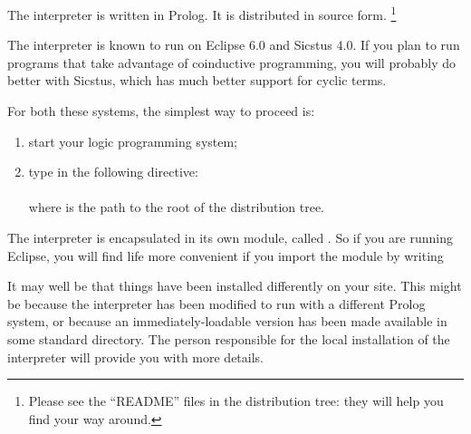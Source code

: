 
The interpreter is written in Prolog.  It is distributed in source
form.%
\footnote{
  Please see the ``README'' files in the distribution tree: they will help you
  find your way around.}

The interpreter is known to run on Eclipse 6.0 and Sicstus 4.0.  If you plan
to run programs that take advantage of coinductive programming, you will
probably do better with Sicstus, which has much better support for cyclic
terms.

For both these systems, the simplest way to proceed is:
\begin{enumerate}
\item start your logic programming system;
\item type in the following directive:\\
  \ind\prog{:-~[~'}\prog{/tabling/dra'~]}\\
  where  is the path to the root of the distribution tree.
\end{enumerate}

The interpreter is encapsulated in its own module, called .  So
if you are running Eclipse, you will find life more convenient if you import
the module by writing\\
\ind{}\label{import-dra}

It may well be that things have been installed differently on your site.
This might be because the interpreter has been modified to run with a
different Prolog system, or because an immediately-loadable version has been
made available in some standard directory. The person responsible for the
local installation of the interpreter will provide you with more details.
